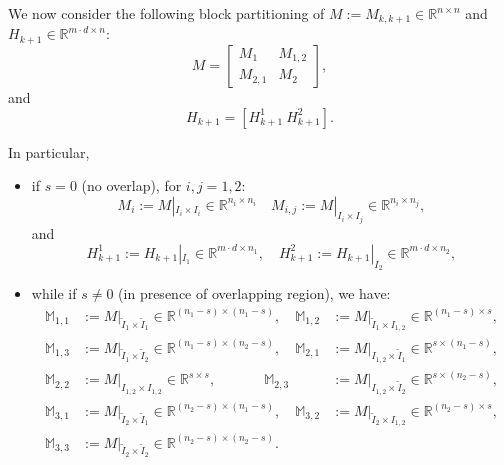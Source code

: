 \documentclass[smallcondensed]{svjour3}
\begin{document}
\noindent We now consider the following block partitioning of   $M:= M_{k,k+1}\in \mathbb{R}^{n\times n}$ and  $H_{k+1}\in \mathbb{R}^{m\cdot d \times n}$: 
\begin{equation}\label{noverlapM}
M=\left[\begin{array}{c|c}
M_{1} & M_{1,2}\\
\hline
M_{2,1} & M_{2}
 \end{array} \right],
\end{equation}
and 
\begin{equation}\label{noverlap-H}
    H_{k+1}=\left[H_{k+1}^{1} \ H_{k+1}^{2}\right].
\end{equation}

\noindent In particular, 
\begin{itemize}
\item  if $s=0$ (no overlap), for $i,j=1,2$:
\begin{equation}\label{deco_M}
M_{i}:=M|_{I_{i}\times I_{i}}\in \mathbb{R}^{n_{i}\times n_{i}}\quad M_{i,j}:=M|_{I_{i} \times I_{j}}\in \mathbb{R}^{n_{i}\times n_{j}},
\end{equation}
    and 
    \begin{equation}
        H_{k+1}^{1}:=H_{k+1}|_{I_{1}}\in \mathbb{R}^{m\cdot d \times n_{1}}, \quad H_{k+1}^{2}:=H_{k+1}|_{I_{2}}\in \mathbb{R}^{m\cdot d \times n_{2}},
    \end{equation}
 


\item while if $s\neq 0$ (in presence of overlapping region), we have:
\begin{displaymath}
\begin{array}{lllllll}
\mathbb{M}_{1,1}&:=M|_{\tilde{I}_{1} \times \tilde{I}_{1}}\in \mathbb{R}^{(n_{1}-s)\times (n_{1}-s)}, \quad
\mathbb{M}_{1,2}&:=M|_{\tilde{I}_{1} \times {I}_{1,2} }\in \mathbb{R}^{(n_{1}-s)\times s},\\
\mathbb{M}_{1,3}&:=M|_{\tilde{I}_{1} \times \tilde{I}_{2} }\in \mathbb{R}^{(n_{1}-s)\times (n_{2}-s)},\quad

\mathbb{M}_{2,1}&:=M|_{{I}_{1,2} \times \tilde{I}_{1}  }\in \mathbb{R}^{s\times (n_{1}-s)},\\
\mathbb{M}_{2,2}&:=M|_{{I}_{1,2} \times {I}_{1,2} }\in \mathbb{R}^{s \times s}, \quad \ \ \ \ \ \ \ \ \ \ \
\mathbb{M}_{2,3}&:=M|_{{I}_{1,2}\times \tilde{I}_{2} }\in \mathbb{R}^{s\times (n_{2}-s)},\\

\mathbb{M}_{3,1}&:=M|_{ \tilde{I}_{2} \times \tilde{I}_{1} }\in \mathbb{R}^{(n_{2}-s)\times (n_{1}-s)}, \quad
\mathbb{M}_{3,2}&:=M|_{ \tilde{I}_{2} \times {I}_{1,2} }\in \mathbb{R}^{(n_{2}-s)\times s}, \\
\mathbb{M}_{3,3}&:=M|_{ \tilde{I}_{2} \times \tilde{I}_{2}  }\in \mathbb{R}^{(n_{2}-s)\times (n_{2}-s)}.
\end{array}
\end{displaymath}


\end{itemize}
\end{document}
